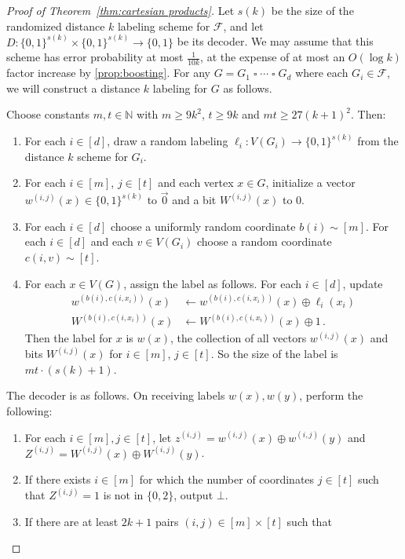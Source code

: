 \documentclass{article}
\newcommand{\zo}{\{0,1\}}
\newcommand{\cF}{\ensuremath{\mathcal{F}}}
\newcommand{\bN}{\ensuremath{\mathbb{N}}}
\begin{document}
\begin{proof}[Proof of Theorem~\ref{thm:cartesian products}]
Let $s(k)$ be the size of the randomized distance $k$ labeling scheme for $\cF$, and let $D :
\zo^{s(k)} \times \zo^{s(k)} \to \zo$ be its decoder. We may assume that this scheme has error
probability at most $\frac1{10k}$, at the expense of at most an $O(\log k)$ factor increase by
\cref{prop:boosting}. For any $G = G_1 \mathbin\square \dotsm \mathbin\square G_d$ where each $G_i \in \cF$, we will
construct a distance $k$ labeling for $G$ as follows.

Choose constants $m,t\in\bN$ with $m \geq 9k^2$, $t \geq 9k$ and $mt\ge 27(k+1)^2$. Then:
\begin{enumerate}
\item For each $i \in [d]$, draw a random labeling $\ell_i : V(G_i) \to \zo^{s(k)}$ from the
distance $k$ scheme for $G_i$.
\item  For each $i \in [m]$, $j \in [t]$ and each vertex $x \in
G$, initialize a vector $w^{(i,j)}(x) \in \zo^{s(k)}$ to $\vec 0$ and a bit $W^{(i,j)}(x)$ to 0.
\item For each $i \in [d]$ choose a uniformly random coordinate $b(i) \sim [m]$. For each $i \in
[d]$ and each $v \in V(G_i)$ choose a random coordinate $c(i,v) \sim [t]$.
\item For each $x \in V(G)$, assign the label as follows. For each $i \in [d]$, update
\begin{align*}
  w^{(b(i), c(i,x_i))}(x) &\gets w^{(b(i), c(i,x_i))}(x) \oplus \ell_i(x_i) \\
  W^{(b(i), c(i,x_i))}(x) &\gets W^{(b(i), c(i,x_i))}(x) \oplus 1 \,.
\end{align*}
Then the label for $x$ is $w(x)$, the collection of all vectors $w^{(i,j)}(x)$ and bits $W^{(i,j)}(x)$ 
for $i \in [m]$, $j \in [t]$.  
So the size of the label is $mt \cdot (s(k)+1)$.
\end{enumerate}
The decoder is as follows. On receiving labels $w(x),w(y)$, perform the following:
\begin{enumerate}
\item For each $i \in [m], j \in [t]$, let $z^{(i,j)} = w^{(i,j)}(x) \oplus w^{(i,j)}(y)$ and
$Z^{(i,j)} = W^{(i,j)}(x) \oplus W^{(i,j)}(y)$.
\item If there exists $i \in [m]$ for which the number of coordinates $j \in [t]$ such that
$Z^{(i,j)} = 1$ is not in $\{0,2\}$, output $\bot$.
\item If there are at least $2k+1$ pairs $(i,j) \in [m] \times [t]$ such that

\end{enumerate}
\end{proof}
\end{document}
